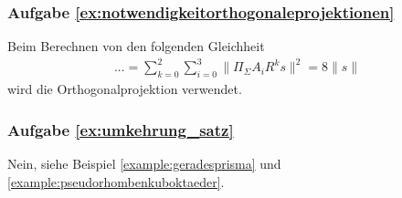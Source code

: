 \subsubsection*{Aufgabe \ref{ex:notwendigkeitorthogonaleprojektionen}}
Beim Berechnen von den folgenden Gleichheit
\begin{align} 
    ...  = \sum_{k=0}^2 \sum_{i=0}^3 \|\Pi_{\Sigma}A_iR^ks\|^2 = 8 \|s\| \nonumber
\end{align}
wird die Orthogonalprojektion verwendet.



\subsubsection*{Aufgabe \ref{ex:umkehrung_satz}}
Nein, siehe Beispiel \ref{example:geradesprisma} und \ref{example:pseudorhombenkuboktaeder}.




